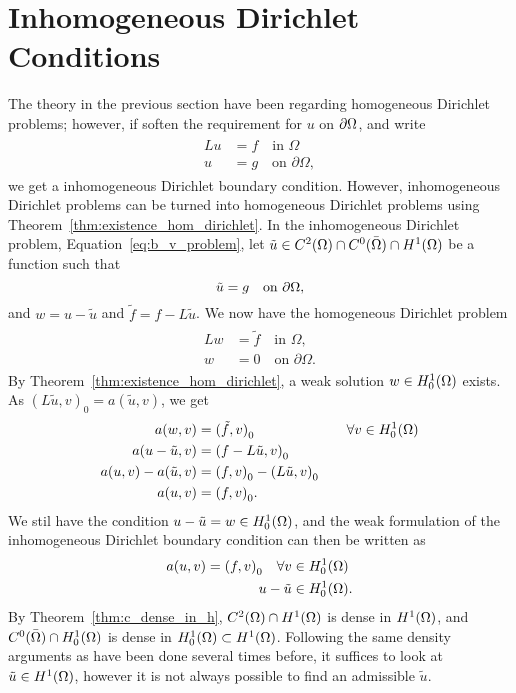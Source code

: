 \section{Inhomogeneous Dirichlet Conditions}
The theory in the previous section have been regarding homogeneous 
Dirichlet problems; however, if soften the requirement for $u$ on $\partial\Omega$,
and write 
\begin{align}
\begin{split}
    Lu &= f \quad \text{in } \Omega \label{eq:b_v_problem} \\
    u &= g \quad \text{on } \partial \Omega,
\end{split}
\end{align}
we get a inhomogeneous Dirichlet boundary condition.
However, inhomogeneous
Dirichlet problems can be turned into homogeneous Dirichlet problems 
using Theorem~\ref{thm:existence_hom_dirichlet}. 
In the inhomogeneous Dirichlet problem, Equation~\eqref{eq:b_v_problem}, let 
$\tilde{u} \in C^2(\Omega)\cap C^0(\bar{\Omega}) \cap H^1(\Omega)$ be a function such that 
\begin{equation*}
   \tilde{u} = g \quad \text{on } \partial \Omega,
\end{equation*}
and $w = u-\tilde{u}$ and $\tilde{f} = f-L\tilde{u}$. We now have the homogeneous 
Dirichlet problem 
\begin{align}
\begin{split}
    Lw &= \tilde{f} \quad \text{in } \Omega,  \\
    w &= 0 \quad \text{on } \partial \Omega. 
\end{split}
\end{align}
By Theorem~\ref{thm:existence_hom_dirichlet},
 a weak solution $w \in H_0^1(\Omega)$ exists. As ${(L\tilde{u},v)}_0 = a(\tilde{u},v)$,
we get
\begin{alignat*}{2}
      a(w,v) &= {(\tilde{f},v)}_0 \quad &&\forall v \in H_0^1(\Omega) \\
      a(u-\tilde{u},v) &= {(f-L\tilde{u},v)}_0 &&\\
      a(u,v) - a(\tilde{u},v) &= {(f,v)}_0 - {(L\tilde{u},v)}_0 \quad && \\
      a(u,v) &= {(f,v)}_0. &&
\end{alignat*}
We stil have the condition $u-\tilde{u}=w\in H_0^1(\Omega)$, and the weak formulation 
of the inhomogeneous Dirichlet boundary condition can then be written as
\begin{align*}
   a(u,v) = {(f,v)}_0 \quad \forall v &\in H_0^1(\Omega) \\
   u-\tilde{u} & \in H_0^1(\Omega).
\end{align*}
By Theorem~\ref{thm:c_dense_in_h}, $C^2(\Omega)\cap H^1(\Omega)$ is dense in $H^1(\Omega)$, 
and $C^0(\bar{\Omega})\cap H^1_0(\Omega)$ 
is dense in $H^1_0(\Omega) \subset H^1(\Omega)$. Following the same density arguments 
as have been done several times before, it suffices to look at $\tilde{u}\in H^1(\Omega)$, however it is not always possible to find an admissible $\tilde{u}$.

